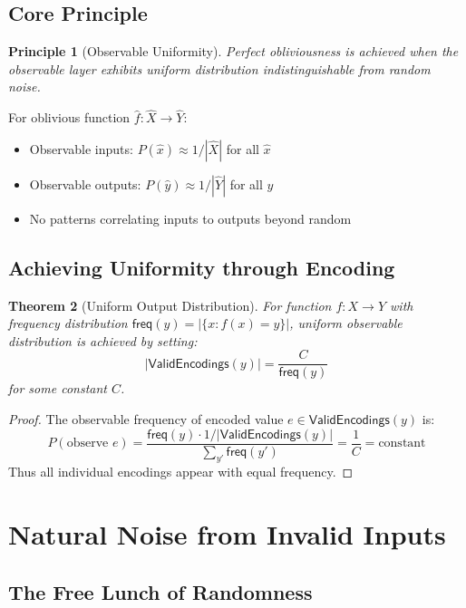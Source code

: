 \documentclass[11pt,final,hidelinks]{article}
\newcommand{\ValidEnc}[1]{\mathsf{ValidEncodings}(#1)}
\newcommand{\Freq}[1]{\mathsf{freq}(#1)}
\newtheorem{theorem}{Theorem}[section]
\newtheorem{principle}[theorem]{Principle}
\begin{document}
\subsection{Core Principle}

\begin{principle}[Observable Uniformity]
Perfect obliviousness is achieved when the observable layer exhibits uniform distribution indistinguishable from random noise.
\end{principle}

For oblivious function $\hat{f}: \hat{X} \to \hat{Y}$:
\begin{itemize}
    \item Observable inputs: $P(\hat{x}) \approx 1/|\hat{X}|$ for all $\hat{x}$
    \item Observable outputs: $P(\hat{y}) \approx 1/|\hat{Y}|$ for all $\hat{y}$
    \item No patterns correlating inputs to outputs beyond random
\end{itemize}

\subsection{Achieving Uniformity through Encoding}

\begin{theorem}[Uniform Output Distribution]
For function $f: X \to Y$ with frequency distribution $\Freq{y} = |\{x : f(x) = y\}|$, uniform observable distribution is achieved by setting:
\begin{equation}
|\ValidEnc{y}| = \frac{C}{\Freq{y}}
\end{equation}
for some constant $C$.
\end{theorem}

\begin{proof}
The observable frequency of encoded value $e \in \ValidEnc{y}$ is:
\begin{equation}
P(\text{observe } e) = \frac{\Freq{y} \cdot 1/|\ValidEnc{y}|}{\sum_{y'} \Freq{y'}} = \frac{1}{C} = \text{constant}
\end{equation}
Thus all individual encodings appear with equal frequency.
\end{proof}

\section{Natural Noise from Invalid Inputs}

\subsection{The Free Lunch of Randomness}
\end{document}
